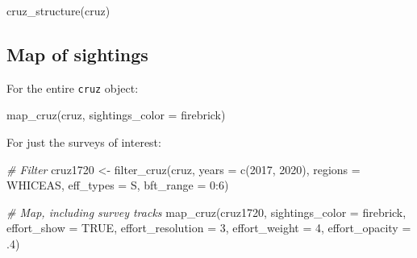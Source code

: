 \documentclass[
]{book}
\newenvironment{Shaded}{\begin{snugshade}}{\end{snugshade}}
\newcommand{\AttributeTok}[1]{\textcolor[rgb]{0.77,0.63,0.00}{#1}}
\newcommand{\CommentTok}[1]{\textcolor[rgb]{0.56,0.35,0.01}{\textit{#1}}}
\newcommand{\ConstantTok}[1]{\textcolor[rgb]{0.00,0.00,0.00}{#1}}
\newcommand{\DecValTok}[1]{\textcolor[rgb]{0.00,0.00,0.81}{#1}}
\newcommand{\FunctionTok}[1]{\textcolor[rgb]{0.00,0.00,0.00}{#1}}
\newcommand{\NormalTok}[1]{#1}
\newcommand{\OtherTok}[1]{\textcolor[rgb]{0.56,0.35,0.01}{#1}}
\newcommand{\SpecialCharTok}[1]{\textcolor[rgb]{0.00,0.00,0.00}{#1}}
\newcommand{\StringTok}[1]{\textcolor[rgb]{0.31,0.60,0.02}{#1}}
\begin{document}
\begin{Shaded}
\begin{Highlighting}[]
\FunctionTok{cruz\_structure}\NormalTok{(cruz)}
\end{Highlighting}
\end{Shaded}

\hypertarget{map-of-sightings}{%
\subsection*{Map of sightings}\label{map-of-sightings}}

For the entire \texttt{cruz} object:

\begin{Shaded}
\begin{Highlighting}[]
\FunctionTok{map\_cruz}\NormalTok{(cruz, }\AttributeTok{sightings\_color =} \StringTok{\textquotesingle{}firebrick\textquotesingle{}}\NormalTok{)}
\end{Highlighting}
\end{Shaded}

For just the surveys of interest:

\begin{Shaded}
\begin{Highlighting}[]
\CommentTok{\# Filter}
\NormalTok{cruz1720 }\OtherTok{\textless{}{-}} \FunctionTok{filter\_cruz}\NormalTok{(cruz, }
                        \AttributeTok{years =} \FunctionTok{c}\NormalTok{(}\DecValTok{2017}\NormalTok{, }\DecValTok{2020}\NormalTok{), }
                        \AttributeTok{regions =} \StringTok{\textquotesingle{}WHICEAS\textquotesingle{}}\NormalTok{,}
                        \AttributeTok{eff\_types =} \StringTok{\textquotesingle{}S\textquotesingle{}}\NormalTok{,}
                        \AttributeTok{bft\_range =} \DecValTok{0}\SpecialCharTok{:}\DecValTok{6}\NormalTok{)}

\CommentTok{\# Map, including survey tracks}
\FunctionTok{map\_cruz}\NormalTok{(cruz1720,}
         \AttributeTok{sightings\_color =} \StringTok{\textquotesingle{}firebrick\textquotesingle{}}\NormalTok{, }
         \AttributeTok{effort\_show =} \ConstantTok{TRUE}\NormalTok{, }
         \AttributeTok{effort\_resolution =} \DecValTok{3}\NormalTok{,}
         \AttributeTok{effort\_weight =} \DecValTok{4}\NormalTok{,}
         \AttributeTok{effort\_opacity =}\NormalTok{ .}\DecValTok{4}\NormalTok{)}
\end{Highlighting}
\end{Shaded}
\end{document}
